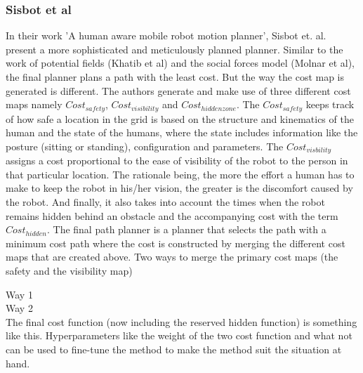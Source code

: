 \subsubsection*{Sisbot et al}
In their work 'A human aware mobile robot motion planner', Sisbot et. al. present a more sophisticated and meticulously planned planner. Similar to the work of potential fields (Khatib et al) and the social forces model (Molnar et al), the final planner plans a path with the least cost. But the way the cost map is generated is different.
The authors generate and make use of three different cost maps namely $Cost_{safety}$, $Cost_{visibility}$ and $Cost_{hidden zone}$.
The $Cost_{safety}$ keeps track of how safe a location in the grid is based on the structure and kinematics of the human and the state of the humans, where the state includes information like the posture (sitting or standing), configuration and parameters.
The $Cost_{visbility}$ assigns a cost proportional to the ease of visibility of the robot to the person in that particular location. The rationale being, the more the effort a human has to make to keep the robot in his/her vision, the greater is the discomfort caused by the robot.
And finally, it also takes into account the times when the robot remains hidden behind an obstacle and the accompanying cost with the term $Cost_{hidden}$. 
The final path planner is a planner that selects the path with a minimum cost path where the cost is constructed by merging the different cost maps that are created above.
Two ways to merge the primary cost maps (the safety and the visibility map)

Way 1\\
Way 2\\

The final cost function (now including the reserved hidden function) is something like this.
Hyperparameters like the weight of the two cost function and what not can be used to fine-tune the method to make the method suit the situation at hand.

